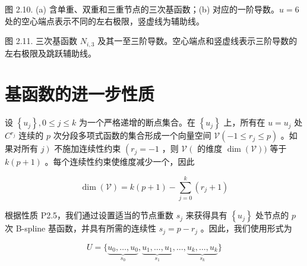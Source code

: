\documentclass[../main.tex]{subfiles}
\begin{document}
\begin{center}
\begin{minipage}{18cm}
\vspace*{.6\baselineskip}
\centering
{}
\par\smallskip
图 2.10. (a) 含单重、双重和三重节点的三次基函数；(b) 对应的一阶导数。\(u=6\) 处的空心端点表示不同的左右极限，竖虚线为辅助线。
\end{minipage}
\end{center}

\begin{center}
\begin{minipage}{18cm}
\vspace*{.6\baselineskip}
\centering
{}
\par\smallskip
图 2.11. 三次基函数 \({N}_{i,3}\) 及其一至三阶导数。空心端点和竖虚线表示三阶导数的左右极限及跳跃辅助线。
\end{minipage}
\end{center}

\section{基函数的进一步性质}

设 \(\left\{  {u}_{j}\right\}  ,0 \leq  j \leq  k\) 为一个严格递增的断点集合。在 \(\left\{  {u}_{j}\right\}\) 上，所有在 \(u = {u}_{j}\) 处 \({C}^{{r}_{j}}\) 连续的 \(p\) 次分段多项式函数的集合形成一个向量空间 \(\mathcal{V}\left( {-1 \leq  {r}_{j} \leq  p}\right)\) 。如果对所有 \(\left. j\right)\) 不施加连续性约束 \(\left( {{r}_{j} =  - 1}\right.\) ，则 \(\mathcal{V}\left( \right.\) 的维度 \(\dim \left( \mathcal{V}\right) )\) 等于 \(k\left( {p + 1}\right)\) 。每个连续性约束使维度减少一个，因此

\[
\dim \left( \mathcal{V}\right)  = k\left( {p + 1}\right)  - \mathop{\sum }\limits_{{j = 0}}^{k}\left( {{r}_{j} + 1}\right)  \tag{2.12}
\]



根据性质 P2.5，我们通过设置适当的节点重数 \({s}_{j}\) 来获得具有 \(\left\{  {u}_{j}\right\}\) 处节点的 \(p\) 次 B-spline 基函数，并具有所需的连续性 \({s}_{j} = p - {r}_{j}\) 。因此，我们使用形式为

\[
U = \{ \underset{{s}_{0}}{\underbrace{{u}_{0},\ldots ,{u}_{0}}},\underset{{s}_{1}}{\underbrace{{u}_{1},\ldots ,{u}_{1}}},\ldots ,\underset{{s}_{k}}{\underbrace{{u}_{k},\ldots ,{u}_{k}}}\}
\]
\end{document}
